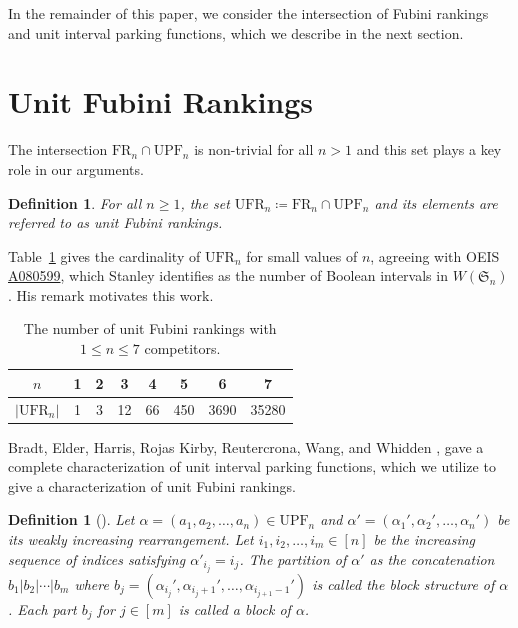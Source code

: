 \documentclass[11pt,reqno]{amsart}
\newcommand{\fr}[1]{\text{FR}_{#1}}
\newcommand{\ufr}[1]{\mathrm{UFR}_{#1}}
\newcommand{\upf}[1]{\mathrm{UPF}_{#1}}
\newtheorem{definition}[rethm]{Definition}
\begin{document}
In the remainder of this paper, we consider the intersection of Fubini rankings and unit interval parking functions, which we describe in the next section.

\section{Unit Fubini Rankings}\label{sec:ufr}

The intersection $\fr{n}\cap \upf{n}$ is non-trivial for all $n>1$ and this set plays a key role in our arguments.
\begin{definition}
    For all $n\geq 1$, the set $\ufr{n}\coloneqq\fr{n}\cap \upf{n}$ and its elements are referred to as \emph{unit Fubini rankings}. 
\end{definition}
Table~\ref{tab: UFR_n} gives the cardinality of $\ufr{n}$ for small values of $n$, agreeing with OEIS \href{https://oeis.org/A080599}{A080599}, which Stanley identifies as the number of Boolean intervals in $W(\mathfrak{S}_n)$. 
His remark motivates this work.

\begin{table}[!ht]
    \centering
    \begin{tabular}{c|c|c|c|c|c|c|c}
      $n$   &  1 & 2 & 3 & 4 & 5 & 6 & 7\\
      \hline
       $|\ufr{n}|$   & 1 & 3 & 12 & 66 & 450 & 3690 & 35280
    \end{tabular}
    \caption{The number of unit Fubini rankings with $1\leq n\leq 7$ competitors.}
\label{tab: UFR_n}
\end{table}

Bradt, Elder, Harris, Rojas Kirby, Reutercrona, Wang, and Whidden \cite{bradt2024unit}, gave a complete characterization of unit interval parking functions, which we utilize to give a characterization of unit Fubini rankings. 

\begin{definition}[\cite{bradt2024unit}]
\label{def: block structure}
Let $\alpha = (a_1, a_2, \ldots, a_n) \in \upf{n}$ and $\alpha' = (\alpha_1', \alpha_2', \ldots, \alpha_n')$ be its weakly increasing rearrangement.
Let $i_1, i_2, \ldots, i_m \in [n]$ be the increasing sequence of indices satisfying $\alpha'_{i_j} = i_j$.
The partition of $\alpha'$ as the concatenation $b_1|b_2|\cdots|b_m$ where $b_j = (\alpha_{i_j}', \alpha_{i_j + 1}',\ldots, \alpha_{i_{j+1}-1}')$ is called the \textit{block structure} of $\alpha$. 
Each part $b_j$ for $j \in [m]$ is called a \emph{block} of $\alpha$.
\end{definition} 
\end{document}
